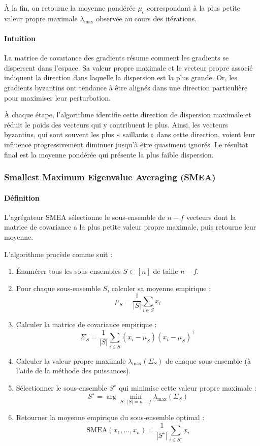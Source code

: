 \documentclass[a4paper,11pt]{article}
\begin{document}
À la fin, on retourne la moyenne pondérée $\mu_c$ correspondant à la plus petite valeur propre maximale $\lambda_{\max}$ observée au cours des itérations.

\paragraph{Intuition}

La matrice de covariance des gradients résume comment les gradients se dispersent dans l'espace. Sa valeur propre maximale et le vecteur propre associé indiquent la direction dans laquelle la dispersion est la plus grande. Or, les gradients byzantins ont tendance à être alignés dans une direction particulière pour maximiser leur perturbation.

À chaque étape, l'algorithme identifie cette direction de dispersion maximale et réduit le poids des vecteurs qui y contribuent le plus. Ainsi, les vecteurs byzantins, qui sont souvent les plus « saillants » dans cette direction, voient leur influence progressivement diminuer jusqu'à être quasiment ignorés. Le résultat final est la moyenne pondérée qui présente la plus faible dispersion.

\subsubsection{Smallest Maximum Eigenvalue Averaging (SMEA)}

\paragraph{Définition}

L'agrégateur SMEA sélectionne le sous-ensemble de $n-f$ vecteurs dont la matrice de covariance a la plus petite valeur propre maximale, puis retourne leur moyenne.

L'algorithme procède comme suit :

\begin{enumerate}
\item Énumérer tous les sous-ensembles $S \subset [n]$ de taille $n-f$.
\item Pour chaque sous-ensemble $S$, calculer sa moyenne empirique :
\[
\mu_S = \frac{1}{|S|} \sum_{i \in S} x_i
\]
\item Calculer la matrice de covariance empirique :
\[
\Sigma_S = \frac{1}{|S|} \sum_{i \in S} (x_i - \mu_S)(x_i - \mu_S)^\top
\]
\item Calculer la valeur propre maximale $\lambda_{\max}(\Sigma_S)$ de chaque sous-ensemble (à l'aide de la méthode des puissances).
\item Sélectionner le sous-ensemble $S^\star$ qui minimise cette valeur propre maximale :
\[
S^\star = \arg\min_{S\,:\,|S|=n-f} \lambda_{\max}(\Sigma_S)
\]
\item Retourner la moyenne empirique du sous-ensemble optimal :
\[
\mathrm{SMEA}(x_1,\dots,x_n) = \frac{1}{|S^\star|} \sum_{i \in S^\star} x_i
\]
\end{enumerate}
\end{document}
